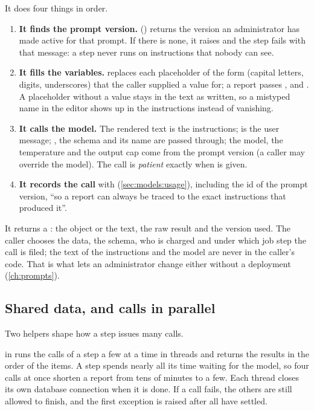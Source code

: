 It does four things in order.

\begin{enumerate}
  \item \textbf{It finds the prompt version.} 
    () returns the version an administrator has made active for that
    prompt. If there is none, it raises  and the step fails with
    that message: a step never runs on instructions that nobody can see.
  \item \textbf{It fills the variables.}  replaces each placeholder of the form
     (capital letters, digits, underscores) that the caller supplied a value for;
    a report passes ,  and . A placeholder
    without a value stays in the text as written, so a mistyped name in the editor shows up in
    the instructions instead of vanishing.
  \item \textbf{It calls the model.} The rendered text is the instructions;  is the
    user message; , the schema and its name are passed through; the model, the
    temperature and the output cap come from the prompt version (a caller may override the
    model). The call is \emph{patient} exactly when  is given.
  \item \textbf{It records the call} with  (\cref{sec:models:usage}),
    including the id of the prompt version, \enquote{so a report can always be traced to the
    exact instructions that produced it}.
\end{enumerate}

It returns a : the object or the text, the raw result and the version used.
The caller chooses the data, the schema, who is charged and under which job step the call is
filed; the text of the instructions and the model are never in the caller's code. That is what
lets an administrator change either without a deployment (\cref{ch:prompts}).

\subsection{Shared data, and calls in parallel}

Two helpers shape how a step issues many calls.

 in  runs the calls of a
step a few at a time in threads and returns the results in the order of the items. A step
spends nearly all its time waiting for the model, so four calls at once shorten a report from
tens of minutes to a few. Each thread closes its own database connection when it is done. If a
call fails, the others are still allowed to finish, and the first exception is raised after
all have settled.

